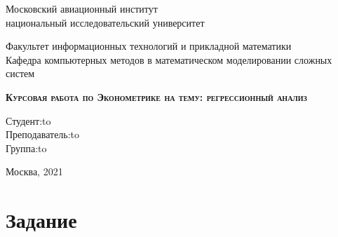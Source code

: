 \documentclass[a4paper,12pt]{article}
\begin{document}
\newpage

\begin{center}
    \large
    Московский авиационный институт \\
    национальный исследовательский университет\\
\end{center}

\vspace{8em}

\begin{center}
    \Large
    Факультет информационных технологий и прикладной математики\\
    Кафедра компьютерных методов в математическом моделировании сложных систем \\ 
\end{center}

\vspace{2em}

\begin{center}
    \textsc{\textbf{Курсовая работа по Эконометрике \linebreak на тему: \linebreak регрессионный анализ}}
\end{center}

\vspace{20em}



\newbox{\lbox}
\newlength{\maxl}
\setlength{\maxl}{\wd\lbox}
\hfill\parbox{11cm}{
    \hspace*{5cm}\hspace*{-5cm}Студент:\hfill\hbox to\\
    \hspace*{5cm}\hspace*{-5cm}Преподаватель:\hfill\hbox to\\
    \hspace*{5cm}\hspace*{-5cm}Группа:\hfill\hbox to\\
}


\vspace{\fill}

\begin{center}
    Москва, 2021
\end{center}


\newpage
\tableofcontents
\newpage
\normalsize


\section{Задание}
\end{document}

